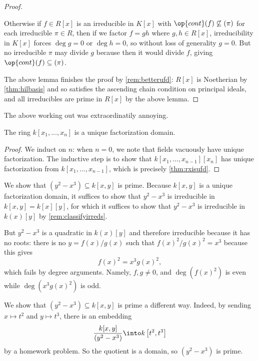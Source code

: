 \begin{proof}
\begin{remark}[Nir]
		Otherwise if $f\in R[x]$ is an irreducible in $K[x]$ with $\op{cont}(f)\not\subseteq(\pi)$ for each irreducible $\pi\in R$, then if we factor $f=gh$ where $g,h\in R[x]$, irreducibility in $K[x]$ forces $\deg g=0$ or $\deg h=0$, so without loss of generality $g=0$. But no irreducible $\pi$ may divide $g$ because then it would divide $f$, giving $\op{cont}(f)\subseteq(\pi)$.
	\end{remark}
	The above lemma finishes the proof by \autoref{rem:betterufd}: $R[x]$ is Noetherian by \autoref{thm:hilbasis} and so satisfies the ascending chain condition on principal ideals, and all irreducibles are prime in $R[x]$ by the above lemma.
\end{proof}
\begin{remark}[Nir]
	The above working out was extraordinatily annoying.
\end{remark}
\begin{corollary}
	The ring $k[x_1,\ldots,x_n]$ is a unique factorization domain.
\end{corollary}
\begin{proof}
	We induct on $n$: when $n=0$, we note that fields vacuously have unique factorization. The inductive step is to show that $k[x_1,\ldots,x_{n-1}][x_n]$ has unique factorization from $k[x_1,\ldots,x_{n-1}]$, which is precisely \autoref{thm:rxisufd}.
\end{proof}
\begin{example}
	We show that $\left(y^2-x^3\right)\subseteq k[x,y]$ is prime. Because $k[x,y]$ is a unique factorization domain, it suffices to show that $y^2-x^3$ is irreducible in $k[x,y]=k[x][y]$, for which it suffices to show that $y^2-x^3$ is irreducible in $k(x)[y]$ by \autoref{rem:classifyirreds}.
	
	But $y^2-x^3$ is a quadratic in $k(x)[y]$ and therefore irreducible because it has no roots: there is no $y=f(x)/g(x)$ such that $f(x)^2/g(x)^2=x^3$ because this gives
	\[f(x)^2=x^3g(x)^2,\]
	which fails by degree arguments. Namely, $f,g\ne0$, and $\deg\left(f(x)^2\right)$ is even while $\deg\left(x^3g(x)^2\right)$ is odd.
\end{example}
\begin{example}
	We show that $\left(y^2-x^3\right)\subseteq k[x,y]$ is prime a different way. Indeed, by sending $x\mapsto t^2$ and $y\mapsto t^3$, there is an embedding
	\[\frac{k[x,y]}{\left(y^2-x^3\right)}\into k\left[t^2,t^3\right]\]
	by a homework problem. So the quotient is a domain, so $\left(y^2-x^3\right)$ is prime.
\end{example}

